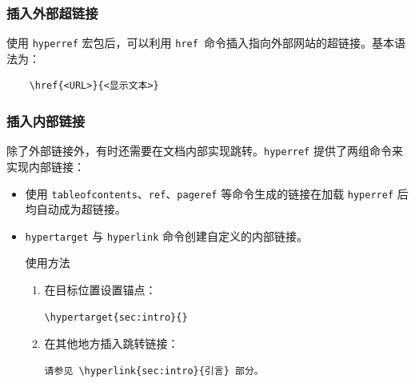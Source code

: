 \subsubsection{插入外部超链接}
使用 \texttt{hyperref} 宏包后，可以利用 \texttt{href }命令插入指向外部网站的超链接。基本语法为：
\begin{lstlisting}
	\href{<URL>}{<显示文本>} 
\end{lstlisting}


\subsubsection{插入内部链接}
除了外部链接外，有时还需要在文档内部实现跳转。\texttt{hyperref} 提供了两组命令来实现内部链接：
\begin{itemize}
	\item [自动链接：]使用 \texttt{tableofcontents}、\texttt{ref}、\texttt{pageref} 等命令生成的链接在加载 \texttt{hyperref} 后均自动成为超链接。
	
	\item [自定义内部链接：]\texttt{hypertarget} 与 \texttt{hyperlink} 命令创建自定义的内部链接。
	\begin{mybox}{使用方法}
		\begin{enumerate}
			\item 在目标位置设置锚点：
			\begin{lstlisting}
\hypertarget{sec:intro}{}
			\end{lstlisting}
			\item 在其他地方插入跳转链接：
			\begin{lstlisting}
请参见 \hyperlink{sec:intro}{引言} 部分。
			\end{lstlisting}
		\end{enumerate}
		
		
	\end{mybox}
\end{itemize}

